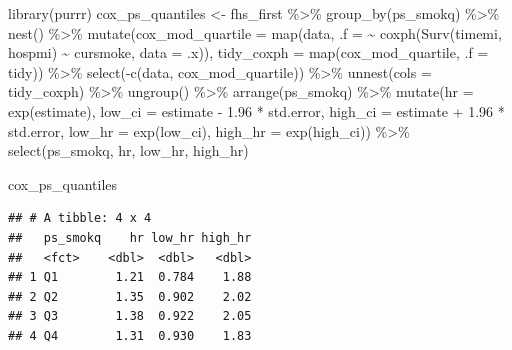 \documentclass[
]{book}
\newenvironment{Shaded}{\begin{snugshade}}{\end{snugshade}}
\newcommand{\AttributeTok}[1]{\textcolor[rgb]{0.77,0.63,0.00}{#1}}
\newcommand{\FloatTok}[1]{\textcolor[rgb]{0.00,0.00,0.81}{#1}}
\newcommand{\FunctionTok}[1]{\textcolor[rgb]{0.00,0.00,0.00}{#1}}
\newcommand{\NormalTok}[1]{#1}
\newcommand{\OtherTok}[1]{\textcolor[rgb]{0.56,0.35,0.01}{#1}}
\newcommand{\SpecialCharTok}[1]{\textcolor[rgb]{0.00,0.00,0.00}{#1}}
\begin{document}
\begin{Shaded}
\begin{Highlighting}[]
\FunctionTok{library}\NormalTok{(purrr)}
\NormalTok{cox\_ps\_quantiles }\OtherTok{\textless{}{-}}\NormalTok{ fhs\_first }\SpecialCharTok{\%\textgreater{}\%} 
  \FunctionTok{group\_by}\NormalTok{(ps\_smokq) }\SpecialCharTok{\%\textgreater{}\%} 
  \FunctionTok{nest}\NormalTok{() }\SpecialCharTok{\%\textgreater{}\%} 
  \FunctionTok{mutate}\NormalTok{(}\AttributeTok{cox\_mod\_quartile =} \FunctionTok{map}\NormalTok{(data, }
                                \AttributeTok{.f =} \SpecialCharTok{\textasciitilde{}} \FunctionTok{coxph}\NormalTok{(}\FunctionTok{Surv}\NormalTok{(timemi, hospmi) }\SpecialCharTok{\textasciitilde{}} 
\NormalTok{                                               cursmoke, }
                                             \AttributeTok{data =}\NormalTok{ .x)),}
         \AttributeTok{tidy\_coxph =} \FunctionTok{map}\NormalTok{(cox\_mod\_quartile, }\AttributeTok{.f =}\NormalTok{ tidy)) }\SpecialCharTok{\%\textgreater{}\%} 
  \FunctionTok{select}\NormalTok{(}\SpecialCharTok{{-}}\FunctionTok{c}\NormalTok{(data, cox\_mod\_quartile)) }\SpecialCharTok{\%\textgreater{}\%} 
  \FunctionTok{unnest}\NormalTok{(}\AttributeTok{cols =}\NormalTok{ tidy\_coxph) }\SpecialCharTok{\%\textgreater{}\%} 
  \FunctionTok{ungroup}\NormalTok{() }\SpecialCharTok{\%\textgreater{}\%} 
  \FunctionTok{arrange}\NormalTok{(ps\_smokq) }\SpecialCharTok{\%\textgreater{}\%} 
  \FunctionTok{mutate}\NormalTok{(}\AttributeTok{hr =} \FunctionTok{exp}\NormalTok{(estimate),}
         \AttributeTok{low\_ci =}\NormalTok{ estimate }\SpecialCharTok{{-}} \FloatTok{1.96} \SpecialCharTok{*}\NormalTok{ std.error, }
         \AttributeTok{high\_ci =}\NormalTok{ estimate }\SpecialCharTok{+} \FloatTok{1.96} \SpecialCharTok{*}\NormalTok{ std.error, }
         \AttributeTok{low\_hr =} \FunctionTok{exp}\NormalTok{(low\_ci), }
         \AttributeTok{high\_hr =} \FunctionTok{exp}\NormalTok{(high\_ci)) }\SpecialCharTok{\%\textgreater{}\%} 
  \FunctionTok{select}\NormalTok{(ps\_smokq, hr, low\_hr, high\_hr)}

\NormalTok{cox\_ps\_quantiles}
\end{Highlighting}
\end{Shaded}

\begin{verbatim}
## # A tibble: 4 x 4
##   ps_smokq    hr low_hr high_hr
##   <fct>    <dbl>  <dbl>   <dbl>
## 1 Q1        1.21  0.784    1.88
## 2 Q2        1.35  0.902    2.02
## 3 Q3        1.38  0.922    2.05
## 4 Q4        1.31  0.930    1.83
\end{verbatim}
\end{document}
